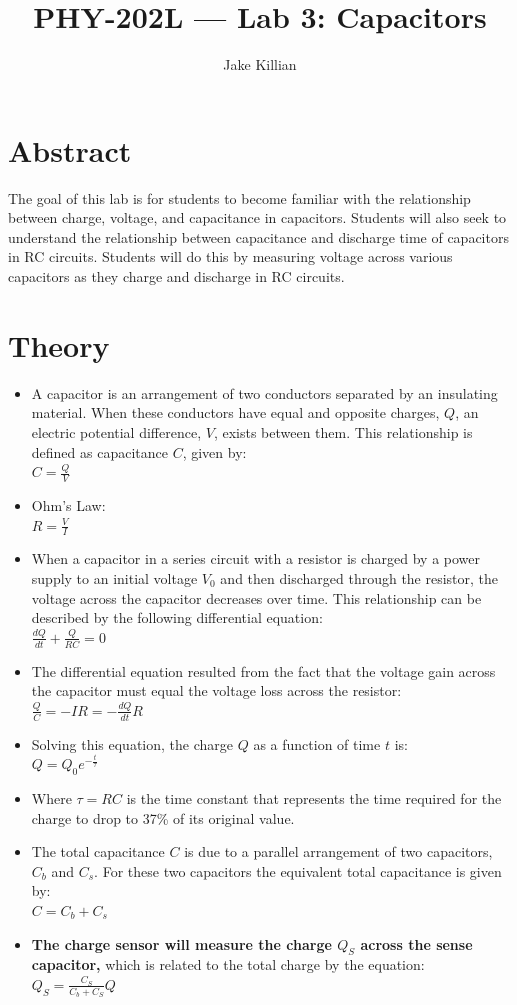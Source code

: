 \documentclass[11pt]{article}
\title{PHY-202L — Lab 3: Capacitors}
\author{Jake Killian}
\date{}
\begin{document}
\maketitle
\section{Abstract}
The goal of this lab is for students to become familiar with the relationship between charge, voltage, and capacitance in capacitors.
Students will also seek to understand the relationship between capacitance and discharge time of capacitors in RC circuits.
Students will do this by measuring voltage across various capacitors as they charge and discharge in RC circuits.
\section{Theory}
\begin{itemize}
    \item A capacitor is an arrangement of two conductors separated by an insulating material.
    When these conductors have equal and opposite charges, $Q$, an electric potential difference, $V$, exists between them.
    This relationship is defined as capacitance $C$, given by:\\
    $
    C=\frac{Q}{V}
    $ \item Ohm's Law:\\
    $
    R=\frac{V}{I}
    $
    \item When a capacitor in a series circuit with a resistor is charged by a power supply to an initial voltage $V_0$ and then discharged through the resistor, the voltage across the capacitor decreases over time.
    This relationship can be described by the following differential equation:\\
    $
    \frac{dQ}{dt}+\frac{Q}{RC}=0
    $
    \item The differential equation resulted from the fact that the voltage gain across the capacitor must equal the voltage loss across the resistor:\\
    $
    \frac{Q}{C}=-IR=-\frac{dQ}{dt}R
    $
    \item Solving this equation, the charge $Q$ as a function of time $t$ is:\\
    $
    Q=Q_0e^{-\frac{t}{\tau}}
    $
    \item Where $\tau=RC$ is the time constant that represents the time required for the charge to drop to 37\% of its original value.
    \item The total capacitance $C$ is due to a parallel arrangement of two capacitors, $C_b$ and $C_s$.
    For these two capacitors the equivalent total capacitance is given by:\\
    $
    C=C_b+C_s
    $
    \item \textbf{The charge sensor will measure the charge $Q_S$ across the sense capacitor,} which is related to the total charge by the equation:\\
    $
    Q_S=\frac{C_S}{C_b+C_S}Q
    $
\end{itemize}
\end{document}
